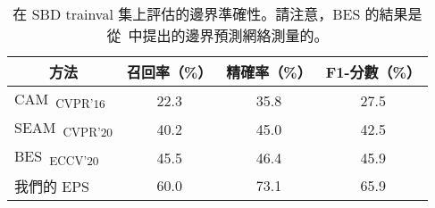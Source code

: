 \begin{table}[]
\centering
{\small
\begin{tabular}{@{}lccc@{}}
\toprule
\multicolumn{1}{c}{方法}                      & 召回率（\%） & 精確率（\%） & F1-分數（\%） \\ \midrule
\multicolumn{1}{l}{CAM~\cite{zhou2016learning}\textsubscript{CVPR'16}} & 22.3        & 35.8           & 27.5           \\
\multicolumn{1}{l}{SEAM~\cite{wang2020self}\textsubscript{CVPR'20}}    & 40.2        & 45.0           & 42.5           \\
\multicolumn{1}{l}{BES~\cite{chen2020boundary}\textsubscript{ECCV'20}} & 45.5        & 46.4           & 45.9           \\
\multicolumn{1}{l}{我們的 EPS}                        & 60.0        & 73.1          & 65.9           \\ \bottomrule
\end{tabular}
}
\vspace{2mm}
\caption{在 SBD trainval 集上評估的邊界準確性。請注意，BES 的結果是從~\cite{chen2020boundary}中提出的邊界預測網絡測量的。} \vspace{-2mm}
\label{tab:boundary}
\end{table}

